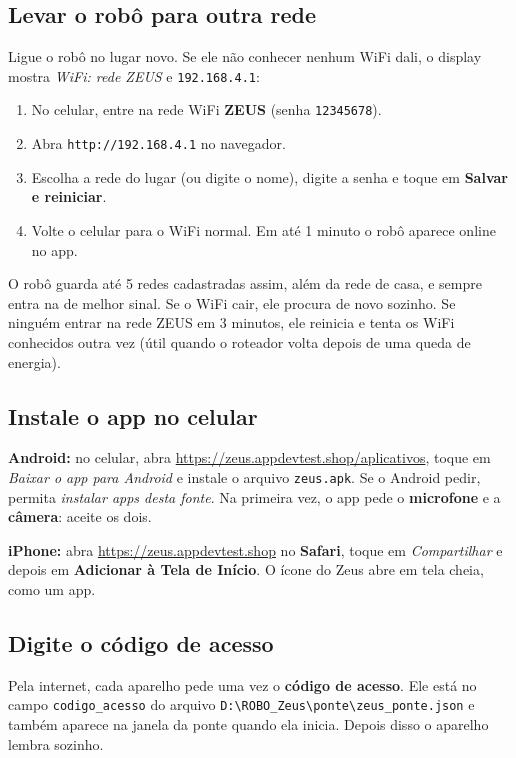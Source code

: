 \documentclass[11pt,a4paper]{article}
\newcommand{\bs}{\textbackslash\allowbreak}
\begin{document}
\subsection{Levar o robô para outra rede}
Ligue o robô no lugar novo. Se ele não conhecer nenhum WiFi dali, o display mostra
\emph{WiFi: rede ZEUS} e \texttt{192.168.4.1}:
\begin{enumerate}
  \item No celular, entre na rede WiFi \textbf{ZEUS} (senha \texttt{12345678}).
  \item Abra \texttt{http://192.168.4.1} no navegador.
  \item Escolha a rede do lugar (ou digite o nome), digite a senha e toque em \textbf{Salvar e reiniciar}.
  \item Volte o celular para o WiFi normal. Em até 1 minuto o robô aparece online no app.
\end{enumerate}
O robô guarda até 5 redes cadastradas assim, além da rede de casa, e sempre entra na de melhor
sinal. Se o WiFi cair, ele procura de novo sozinho. Se ninguém entrar na rede ZEUS em 3 minutos,
ele reinicia e tenta os WiFi conhecidos outra vez (útil quando o roteador volta depois de uma
queda de energia).

\subsection{Instale o app no celular}

\textbf{Android:} no celular, abra \url{https://zeus.appdevtest.shop/aplicativos}, toque em
\emph{Baixar o app para Android} e instale o arquivo \texttt{zeus.apk}. Se o Android pedir, permita
\emph{instalar apps desta fonte}. Na primeira vez, o app pede o \textbf{microfone} e a
\textbf{câmera}: aceite os dois.

\textbf{iPhone:} abra \url{https://zeus.appdevtest.shop} no \textbf{Safari}, toque em
\emph{Compartilhar} e depois em \textbf{Adicionar à Tela de Início}. O ícone do Zeus abre em tela
cheia, como um app.

\subsection{Digite o código de acesso}
Pela internet, cada aparelho pede uma vez o \textbf{código de acesso}. Ele está no campo
\texttt{codigo\_acesso} do arquivo \texttt{D:\bs{}ROBO\_Zeus\bs{}ponte\bs{}zeus\_ponte.json}
e também aparece na janela da ponte quando ela inicia. Depois disso o aparelho lembra sozinho.
\end{document}
